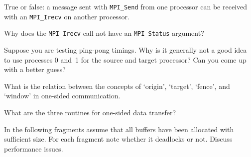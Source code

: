 \begin{review}
  True or false: a message sent with \lstinline{MPI_Send} from one processor can be
  received with an \lstinline{MPI_Irecv} on another processor.
\end{review}

\begin{review}
  Why does the \lstinline{MPI_Irecv} call not have an \lstinline{MPI_Status} argument?
\end{review}

\begin{review}
  Suppose you are testing ping-pong timings.
  Why is it generally not a good idea to use processes 0 and~1 for the
  source and target processor?  Can you come up with a better guess?
\end{review}

\begin{review}
  What is the relation between the concepts of `origin', `target', `fence',
  and `window' in one-sided communication.
\end{review}

\begin{review}
  What are the three routines for one-sided data transfer?
\end{review}

\lstset{
  style=reviewcode,
  language=C,
}

\begin{review}
  In the following fragments %
  assume that all buffers have been
  allocated with sufficient size. For each fragment note whether it
  deadlocks or not. Discuss performance issues.
\end{review}

